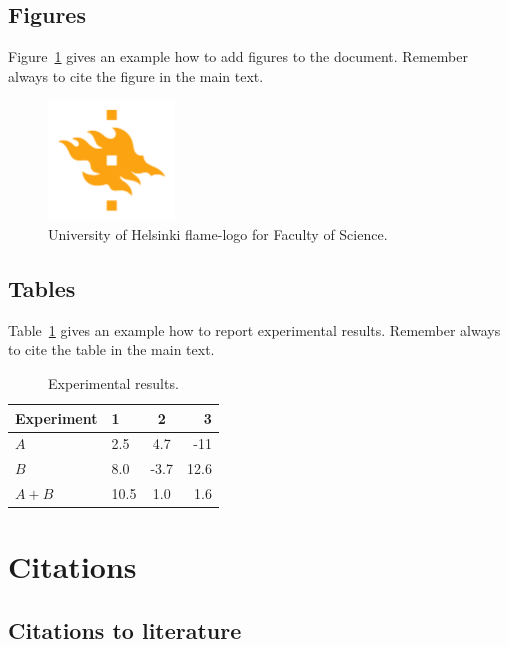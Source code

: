 \section{Figures}
Figure~\ref{fig:logo} gives an example how to add figures to the document. Remember always to cite the figure in the main text.

\begin{figure}[h!] 
\centering 
\includegraphics[width=0.3\textwidth]{HY-logo-ml.png}
\caption{University of Helsinki flame-logo for Faculty of Science.\label{fig:logo}}
\end{figure}

\section{Tables}

Table~\ref{table:results} gives an example how to report experimental results. Remember always to cite the table in the main text. 

\begin{table}
\centering
\caption{Experimental results.\label{table:results}}
\begin{tabular}{l||l c r} 
Experiment & 1 & 2 & 3 \\ 
\hline \hline 
$A$ & 2.5 & 4.7 & -11 \\
$B$ & 8.0 & -3.7 & 12.6 \\
$A+B$ & 10.5 & 1.0 & 1.6 \\
\hline
%
\end{tabular}
\end{table}

\chapter{Citations}

\section{Citations to literature}


